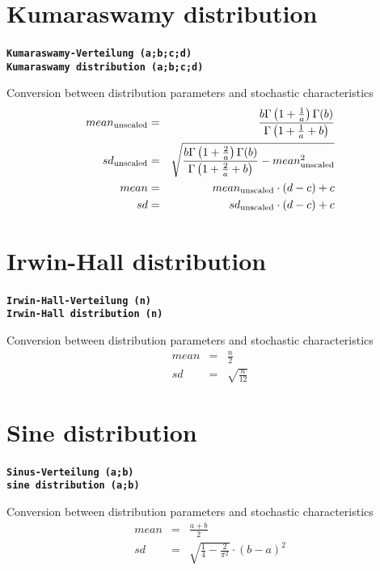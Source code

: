 \documentclass{svmono}
\def\cm#1{\textbf{\texttt{#1}}}
\begin{document}
\section*{Kumaraswamy distribution}
\cm{Kumaraswamy-Verteilung (a;b;c;d)}~\\
\cm{Kumaraswamy distribution (a;b;c;d)}

Conversion between distribution parameters and stochastic characteristics
\begin{eqnarray*}
mean_{\rm unscaled}&=&\frac{b\Gamma\left(1+\frac{1}{a}\right)\Gamma(b)}{\Gamma\left(1+\frac{1}{a}+b\right)}\\
sd_{\rm unscaled}&=&\sqrt{\frac{b\Gamma\left(1+\frac{2}{a}\right)\Gamma(b)}{\Gamma\left(1+\frac{2}{a}+b\right)}-mean_{\rm unscaled}^2}\\
mean&=&mean_{\rm unscaled}\cdot(d-c)+c\\
sd&=&sd_{\rm unscaled}\cdot(d-c)+c\\
\end{eqnarray*}





\section*{Irwin-Hall distribution}
\cm{Irwin-Hall-Verteilung (n)}~\\
\cm{Irwin-Hall distribution (n)}

Conversion between distribution parameters and stochastic characteristics
\begin{eqnarray*}
mean&=&\frac{n}{2}\\
sd&=&\sqrt{\frac{n}{12}}
\end{eqnarray*}





\section*{Sine distribution}
\cm{Sinus-Verteilung (a;b)}~\\
\cm{sine distribution (a;b)}

Conversion between distribution parameters and stochastic characteristics
\begin{eqnarray*}
mean&=&\frac{a+b}{2}\\
sd&=&\sqrt{\frac{1}{4}-\frac{2}{\pi^2}}\cdot(b-a)^2
\end{eqnarray*}
\end{document}
